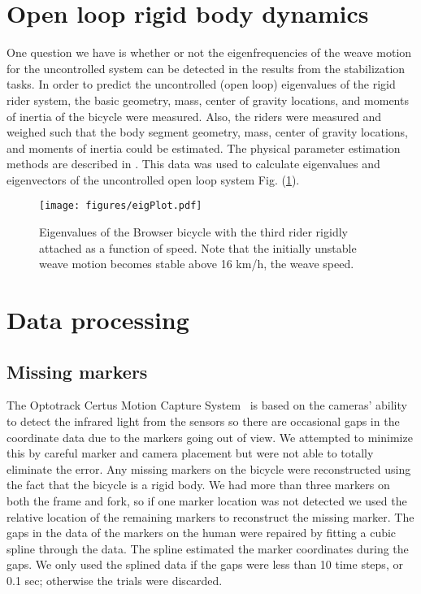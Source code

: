 \documentclass[smallextended]{svjour3}     %
\begin{document}
\section{Open loop rigid body dynamics}
\label{sec:openLoop}
One question we have is whether or not the eigenfrequencies of the weave motion
for the uncontrolled system can be detected in the results from the
stabilization tasks. In order to predict the uncontrolled (open loop)
eigenvalues of the rigid rider system, the basic geometry, mass, center of
gravity locations, and moments of inertia of the bicycle were measured. Also,
the riders were measured and weighed such that the body segment geometry, mass,
center of gravity locations, and moments of inertia could be estimated. The
physical parameter estimation methods are described in \cite{Moore2009a}. This
data was used to calculate eigenvalues and eigenvectors of the uncontrolled open loop system Fig.
(\ref{fig:eigPlot}).
\begin{figure}[tbp]
    \begin{center}
        \texttt{[image: figures/eigPlot.pdf]}
    \end{center}
    \caption{Eigenvalues of the Browser bicycle with the third rider rigidly
    attached as a
    function of speed. Note that the initially unstable weave motion becomes
    stable above 16 km/h, the weave speed.}
    \label{fig:eigPlot}
\end{figure}

\section{Data processing}
\label{sec:data}

\subsection{Missing markers}
\label{sec:missingMarkers}
The Optotrack Certus Motion Capture
System~\cite{NorthernDigitalIncorporated2009} is based on the cameras' ability
to detect the infrared light from the sensors so there are occasional gaps in
the coordinate data due to the markers going out of view. We attempted to
minimize this by careful marker and camera placement but were not able to
totally eliminate the error. Any missing markers on the bicycle were
reconstructed using the fact that the bicycle is a rigid body. We had more than
three markers on both the frame and fork, so if one marker location was not
detected we used the relative location of the remaining markers to reconstruct
the missing marker. The gaps in the data of the markers on the human were
repaired by fitting a cubic spline through the data. The spline estimated the
marker coordinates during the gaps. We only used the splined data if the gaps
were less than 10 time steps, or 0.1 sec; otherwise the trials were discarded.
\end{document}
